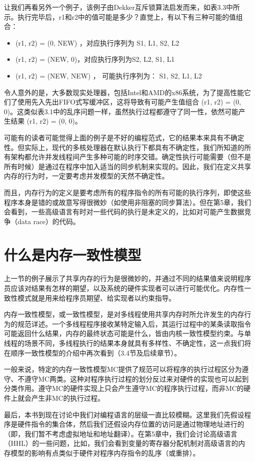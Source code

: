 \documentclass[UTF-8]{ctexrep}
\begin{document}
\par 让我们再看另外一个例子，该例子由Dekker互斥锁算法启发而来，如表3.3中所示。执行完毕后，r1和r2中的值可能是多少？直觉上，有以下有三种可能的值组合：
\begin{itemize}
\item (r1, r2) = (0, NEW) ，对应执行序列为 S1, L1, S2, L2
\item (r1, r2) = (NEW, 0)，对应执行序列为S2, L2, S1, L1
\item (r1, r2) = (NEW, NEW) ， 可能执行序列为： S1, S2, L1, L2
\end{itemize}
\par 令人意外的是，大多数现实处理器，包括Intel和AMD的x86系统，为了提高性能它们了使用先入先出FIFO式写缓冲区，这将导致有可能产生值组合 (r1, r2) = (0, 0)。这类似表3.1中的乱序问题一样，虽然执行过程都遵守了同一性，依然可能产生结果 (r1, r2) = (0, 0)。
\par 可能有的读者可能觉得上面的例子是不好的编程范式，它的结果本来具有不确定性。但实际上，现代的多核处理器在默认执行下都具有不确定性，我们所知道的所有架构都允许并发线程间产生多种可能的时序交错。确定性执行可能需要（但不是所有时候）是通过在程序中加入适当的同步机制来实现的。因此，我们在定义共享内存的行为时，一定要考虑并发模型的天然不确定性。
\par 而且，内存行为的定义是要考虑所有的程序指令的所有可能的执行序列，即使这些程序本身是错的或故意写得很微妙（如使用非阻塞的同步算法）。但在第5章，我们会看到，一些高级语言有时对一些代码的执行是未定义的，比如对可能产生数据竞争（data race）的代码。
\section{什么是内存一致性模型}
上一节的例子展示了共享内存的行为是很微妙的，并通过不同的结果值来说明程序员应该对结果有怎样的期望，以及系统的硬件实现者可以进行可能优化。内存性一致性模式就是用来给程序员期望、给实现者以约束指导。
\par 内存一致性模型，或一致性模型，是对多线程使用共享内存时所允许发生的内存行为的规范详述。一个多线程程序接收某特定输入后，其运行过程中的某条读取指令可能返回什么结果，内存的最终状态可能是什么，皆由内核一致性模型约束。与单线程的场景不同，多线程执行的结果本身就具有多样性、不确定性，这一点我们将在顺序一致性模型的介绍中再次看到（3.4节及后续章节）。
\par 一般来说，特定的内存一致性模型MC提供了规范可以将程序的执行过程区分为遵守、不遵守MC两类。这种对程序执行过程的划分反过来对硬件的实现也可以起到分类作用。遵守MC的硬件实现上只会产生遵守MC的程序执行过程，而非MC的硬件上就会产生非MC的执行过程。 
\par 最后，本书到现在讨论中我们对编程语言的层级一直比较模糊。这里我们先假设程序是硬件指令的集合体，然后我们还假设内存位置的访问是通过物理地址进行的（即，我们暂不考虑虚拟地址和地址翻译）。在第5章中，我们会讨论高级语言（HHL）的一些问题，比如，我们会看到变量的寄存器分配机制对高级语言的内存模型的影响有点类似于硬件对程序内存指令的乱序（或重排）。
\end{document}

